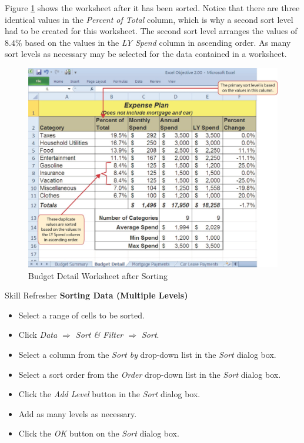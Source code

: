 Figure \ref{02:fig28} shows the  worksheet after it has been sorted. Notice that there are three identical values in the \textit{Percent of Total} column, which is why a second sort level had to be created for this worksheet. The second sort level arranges the values of $ 8.4\% $ based on the values in the \textit{LY Spend} column in ascending order. As many sort levels as necessary may be selected for the data contained in a worksheet.

\begin{figure}[H]
	\centering
	\includegraphics[width=\maxwidth{.95\linewidth}]{gfx/ch02_fig28}
	\caption{Budget Detail Worksheet after Sorting}
	\label{02:fig28}
\end{figure}

\begin{center}
	\begin{sklbox}{Skill Refresher}
		\textbf{Sorting Data (Multiple Levels)}
		\\
		\begin{itemize}
			\setlength{\itemsep}{0pt}
			\setlength{\parskip}{0pt}
			\setlength{\parsep}{0pt}
			
			\item Select a range of cells to be sorted.
			\item Click \textit{Data $ \Rightarrow $ Sort \& Filter $ \Rightarrow $ Sort}.
			\item Select a column from the \textit{Sort by} drop-down list in the \textit{Sort} dialog box.
			\item Select a sort order from the \textit{Order} drop-down list in the \textit{Sort} dialog box.
			\item Click the \textit{Add Level} button in the \textit{Sort} dialog box.
			\item Add as many levels as necessary.
			\item Click the \textit{OK} button on the \textit{Sort} dialog box.
			
		\end{itemize}
	\end{sklbox}
\end{center}

